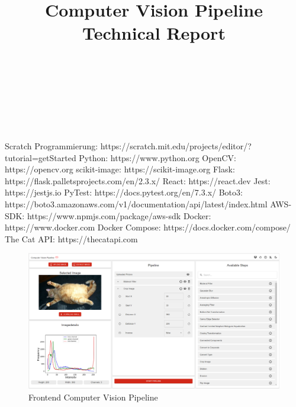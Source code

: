 \documentclass[conference]{IEEEtran}
\begin{document}
\title{\textbf{Computer Vision Pipeline}
	\\Technical Report}

\author{

	\\
	
	\and
	
	\\
	
	\and
	
	\\
	
}


\maketitle



\begin{thebibliography}{00}
	 Scratch Programmierung: https://scratch.mit.edu/projects/editor/?tutorial=getStarted
	 Python: https://www.python.org
	 OpenCV: https://opencv.org
	 scikit-image: https://scikit-image.org
	 Flask: https://flask.palletsprojects.com/en/2.3.x/
	 React: https://react.dev
	 Jest: https://jestjs.io
	 PyTest: https://docs.pytest.org/en/7.3.x/
	 Boto3: https://boto3.amazonaws.com/v1/documentation/api/latest/index.html
	 AWS-SDK: https://www.npmjs.com/package/aws-sdk
	 Docker: https://www.docker.com
	 Docker Compose: https://docs.docker.com/compose/
	 The Cat API: https://thecatapi.com
\end{thebibliography}
\vspace{12pt}

\begin{figure}[ht]
    \centering
    \includegraphics[width=\textheight, angle=90, keepaspectratio]{Bilder/frontend_webseite}
    \caption{Frontend Computer Vision Pipeline}
    \label{fig:webseite}
\end{figure}
\end{document}
